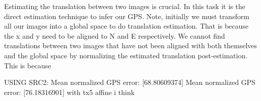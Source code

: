 Estimating the translation between two images is crucial. In this task it is the direct estimation technique to infer our GPS. Note, initially we must transform all our images into a global space to do translation estimation. That is because the x and y need to be aligned to N and E respectively. We cannot find translations between two images that have not been aligned with both themselves and the global space by normalizing the estimated translation post-estimation. This is because 

USING SRC2: Mean normalized GPS error: [68.80609374]
Mean normalized GPS error: [76.18316901]  with tx5 affine i think
